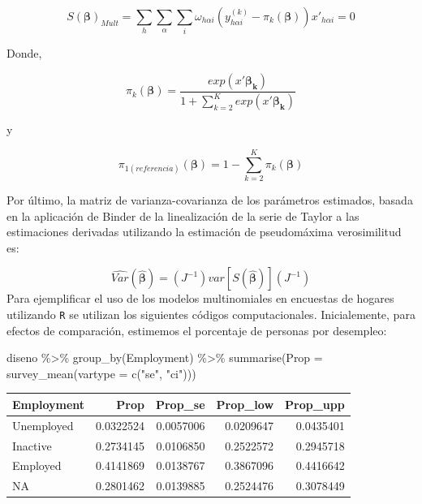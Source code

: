 \documentclass[
  12pt,
]{book}
\newenvironment{Shaded}{\begin{snugshade}}{\end{snugshade}}
\newcommand{\AttributeTok}[1]{\textcolor[rgb]{0.77,0.63,0.00}{#1}}
\newcommand{\FunctionTok}[1]{\textcolor[rgb]{0.00,0.00,0.00}{#1}}
\newcommand{\NormalTok}[1]{#1}
\newcommand{\SpecialCharTok}[1]{\textcolor[rgb]{0.00,0.00,0.00}{#1}}
\newcommand{\StringTok}[1]{\textcolor[rgb]{0.31,0.60,0.02}{#1}}
\begin{document}
\[
S\left(\boldsymbol{\beta}\right)_{Mult}  =  \sum_{h}\sum_{\alpha}\sum_{i}\omega_{h\alpha i}\left(y_{h\alpha i}^{\left(k\right)}-\pi_{k}\left(\boldsymbol{\beta}\right)\right)x'_{h\alpha i}=0
\]

Donde,

\[
\pi_{k}\left(\boldsymbol{\beta}\right)=\frac{exp\left(x'\boldsymbol{\beta_{k}}\right)}{1+{ \sum_{k=2}^{K}exp\left(x'\boldsymbol{\beta_{k}}\right)}}
\]

y

\[
\pi_{1\left(referencia\right)}\left(\boldsymbol{\beta}\right)=1-\sum_{k=2}^{K}\pi_{k}\left(\boldsymbol{\beta}\right)
\]

Por último, la matriz de varianza-covarianza de los parámetros estimados, basada en la aplicación de Binder de la linealización de la serie de Taylor a las estimaciones derivadas utilizando la estimación de pseudomáxima verosimilitud es:

\[
\hat{Var}\left(\hat{\boldsymbol{\beta}}\right)  =  \left(J^{-1}\right)var\left[S\left(\hat{\boldsymbol{\beta}}\right)\right]\left(J^{-1}\right)
\]
Para ejemplificar el uso de los modelos multinomiales en encuestas de hogares utilizando \texttt{R} se utilizan los siguientes códigos computacionales. Inicialemente, para efectos de comparación, estimemos el porcentaje de personas por desempleo:

\begin{Shaded}
\begin{Highlighting}[]
\NormalTok{diseno }\SpecialCharTok{\%\textgreater{}\%} \FunctionTok{group\_by}\NormalTok{(Employment) }\SpecialCharTok{\%\textgreater{}\%} 
  \FunctionTok{summarise}\NormalTok{(}\AttributeTok{Prop =} \FunctionTok{survey\_mean}\NormalTok{(}\AttributeTok{vartype =} \FunctionTok{c}\NormalTok{(}\StringTok{"se"}\NormalTok{, }\StringTok{"ci"}\NormalTok{)))}
\end{Highlighting}
\end{Shaded}

\begin{tabular}{l|r|r|r|r}
\hline
Employment & Prop & Prop\_se & Prop\_low & Prop\_upp\\
\hline
Unemployed & 0.0322524 & 0.0057006 & 0.0209647 & 0.0435401\\
\hline
Inactive & 0.2734145 & 0.0106850 & 0.2522572 & 0.2945718\\
\hline
Employed & 0.4141869 & 0.0138767 & 0.3867096 & 0.4416642\\
\hline
NA & 0.2801462 & 0.0139885 & 0.2524476 & 0.3078449\\
\hline
\end{tabular}
\end{document}
